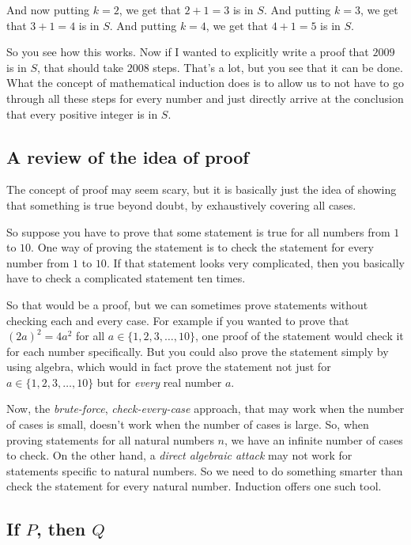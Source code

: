 \documentclass{amsart}
\begin{document}
And now putting $k = 2$, we get that $2 + 1 = 3$ is in $S$. And
putting $k = 3$, we get that $3 + 1 = 4$ is in $S$. And putting $k =
4$, we get that $4 + 1 = 5$ is in $S$.

So you see how this works. Now if I wanted to explicitly write a proof
that $2009$ is in $S$, that should take $2008$ steps. That's a lot,
but you see that it can be done. What the concept of mathematical
induction does is to allow us to not have to go through all these steps
for every number and just directly arrive at the conclusion that every
positive integer is in $S$.

\subsection{A review of the idea of proof}

The concept of proof may seem scary, but it is basically just the idea
of showing that something is true beyond doubt, by exhaustively
covering all cases.

So suppose you have to prove that some statement is true for all
numbers from $1$ to $10$. One way of proving the statement is to check
the statement for every number from $1$ to $10$. If that statement
looks very complicated, then you basically have to check a complicated
statement ten times.

So that would be a proof, but we can sometimes prove statements
without checking each and every case. For example if you wanted to
prove that $(2a)^2 = 4a^2$ for all $a \in \{ 1,2,3,\dots, 10\}$, one
proof of the statement would check it for each number
specifically. But you could also prove the statement simply by using
algebra, which would in fact prove the statement not just for $a \in
\{ 1,2,3, \dots, 10 \}$ but for {\em every} real number $a$.

Now, the {\em brute-force}, {\em check-every-case} approach, that may
work when the number of cases is small, doesn't work when the number
of cases is large. So, when proving statements for all natural numbers
$n$, we have an infinite number of cases to check. On the other hand,
a {\em direct algebraic attack} may not work for statements specific
to natural numbers. So we need to do something smarter than check the
statement for every natural number. Induction offers one such tool.

\subsection*{If $P$, then $Q$}
\end{document}

